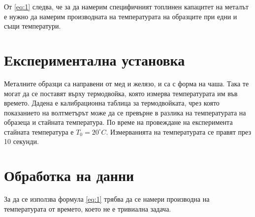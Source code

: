 \documentclass[
 reprint,
 amsmath,amssymb,
 aps,
]{revtex4-2}
\newcommand{\degree}{^{\circ}}
\begin{document}
От \eqref{eq:1} следва, че за да намерим специфичният топлинен капацитет на металът е нужно да намерим производната на температурата на образците при едни и същи температури. 

\section{Експериментална установка}

Металните образци са направени от мед и желязо, и са с форма на чаша. Така те могат да се поставят върху термодвойка, която измерва температурата им във времето. Дадена е калибрационна таблица за термодвойката, чрез която показанието на волтметърът може да се превърне в разлика на температурата на образеца и стайната температура. По време на провеждане на експеримента стайната температура е $T_0 = 20\degree C$. Измерванията на температурата се правят през 10 секунди. 

\section{Обработка на данни}

За да се използва формула \eqref{eq:1} трябва да се намери производна на температурата от времето, което не е тривиална задача. 
\end{document}
